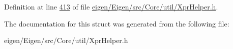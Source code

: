 Definition at line \hyperlink{eigen_2_eigen_2src_2_core_2util_2_xpr_helper_8h_source_l00413}{413} of file \hyperlink{eigen_2_eigen_2src_2_core_2util_2_xpr_helper_8h_source}{eigen/\+Eigen/src/\+Core/util/\+Xpr\+Helper.\+h}.



The documentation for this struct was generated from the following file\+:\begin{DoxyCompactItemize}
\item 
eigen/\+Eigen/src/\+Core/util/\+Xpr\+Helper.\+h\end{DoxyCompactItemize}
